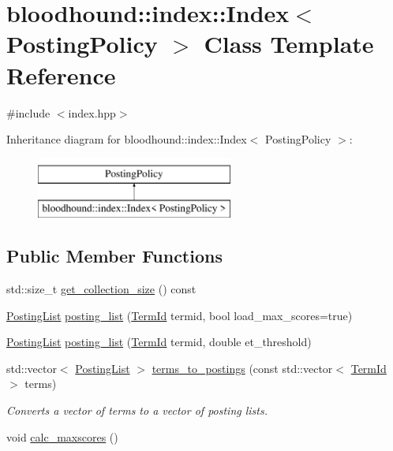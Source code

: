 \hypertarget{classbloodhound_1_1index_1_1Index}{}\section{bloodhound\+:\+:index\+:\+:Index$<$ Posting\+Policy $>$ Class Template Reference}
\label{classbloodhound_1_1index_1_1Index}


{\ttfamily \#include $<$index.\+hpp$>$}

Inheritance diagram for bloodhound\+:\+:index\+:\+:Index$<$ Posting\+Policy $>$\+:\begin{figure}[H]
\begin{center}
\leavevmode
\includegraphics[height=2.000000cm]{classbloodhound_1_1index_1_1Index}
\end{center}
\end{figure}
\subsection*{Public Member Functions}
\begin{DoxyCompactItemize}
\item 
std\+::size\+\_\+t \hyperlink{classbloodhound_1_1index_1_1Index_aead1eb965d1607d25398b874cbd8a269}{get\+\_\+collection\+\_\+size} () const
\item 
\hyperlink{classbloodhound_1_1PostingList}{Posting\+List} \hyperlink{classbloodhound_1_1index_1_1Index_a24cadb41178b2cc81cf8f3e32a5dd516}{posting\+\_\+list} (\hyperlink{structbloodhound_1_1TermId}{Term\+Id} termid, bool load\+\_\+max\+\_\+scores=true)
\item 
\hyperlink{classbloodhound_1_1PostingList}{Posting\+List} \hyperlink{classbloodhound_1_1index_1_1Index_ac26271e4e2678e77d46017a24ed7eac5}{posting\+\_\+list} (\hyperlink{structbloodhound_1_1TermId}{Term\+Id} termid, double et\+\_\+threshold)
\item 
std\+::vector$<$ \hyperlink{classbloodhound_1_1PostingList}{Posting\+List} $>$ \hyperlink{classbloodhound_1_1index_1_1Index_ae36f606ee2206c44d44d0a11ae91b04c}{terms\+\_\+to\+\_\+postings} (const std\+::vector$<$ \hyperlink{structbloodhound_1_1TermId}{Term\+Id} $>$ terms)
\begin{DoxyCompactList}\small\item\em Converts a vector of terms to a vector of posting lists. \end{DoxyCompactList}\item 
void \hyperlink{classbloodhound_1_1index_1_1Index_a00eb8ae8cf8f24430fe170095c4aa4d9}{calc\+\_\+maxscores} ()
\end{DoxyCompactItemize}
